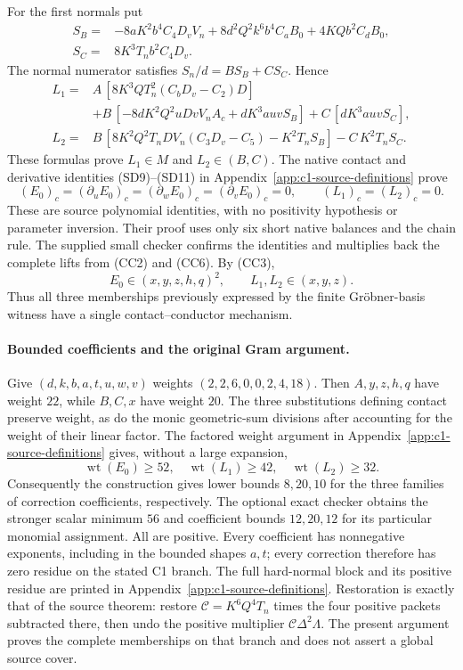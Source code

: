 For the first normals put
\begin{align*}
 S_B={}&-8aK^2b^4C_4D_vV_n
          +8d^2Q^2k^6b^4C_aB_0+4KQb^2C_dB_0,\\
 S_C={}&8K^3T_nb^2C_4D_v.
\end{align*}
The normal numerator satisfies $S_n/d=BS_B+CS_C$. Hence
\begin{align*}
 L_1={}& A\,[8K^3QT_n^2(C_bD_v-C_2)D]\\
 &+B\,[-8dK^2Q^2uDvV_nA_c+dK^3auvS_B]
       +C\,[dK^3auvS_C],\\
 L_2={}&B\,[8K^2Q^2T_nDV_n(C_3D_v-C_5)-K^2T_nS_B]
       -C\,K^2T_nS_C.
\end{align*}
These formulas prove $L_1\in M$ and $L_2\in(B,C)$.
The native contact and derivative identities (SD9)--(SD11) in
Appendix~\ref{app:c1-source-definitions} prove
\[
 (E_0)_c=(\partial_uE_0)_c=(\partial_wE_0)_c
          =(\partial_vE_0)_c=0,\qquad (L_1)_c=(L_2)_c=0.      \tag{CC7}
\]
These are source polynomial identities, with no positivity hypothesis or
parameter inversion. Their proof uses only six short native balances and
the chain rule. The supplied small checker confirms the identities and
multiplies back the complete lifts from (CC2) and (CC6).
By (CC3),
\[
 E_0\in(x,y,z,h,q)^2,\qquad L_1,L_2\in(x,y,z).          \tag{CC8}
\]
Thus all three memberships previously expressed by the finite
Gr\"obner-basis witness have a single contact--conductor mechanism.

\paragraph{Bounded coefficients and the original Gram argument.}
Give $(d,k,b,a,t,u,w,v)$ weights $(2,2,6,0,0,2,4,18)$.
Then $A,y,z,h,q$ have weight $22$, while $B,C,x$ have weight $20$.
The three substitutions defining contact preserve weight, as do the
monic geometric-sum divisions after accounting for the weight of their
linear factor. The factored weight argument in
Appendix~\ref{app:c1-source-definitions} gives, without a large expansion,
\[
 \operatorname{wt}(E_0)\ge52,\quad
 \operatorname{wt}(L_1)\ge42,\quad
 \operatorname{wt}(L_2)\ge32.
\]
Consequently the construction gives lower bounds $8,20,10$ for the
three families of correction coefficients, respectively. The optional
exact checker obtains the stronger scalar minimum $56$ and coefficient
bounds $12,20,12$ for its particular monomial assignment.
All are positive. Every coefficient has nonnegative
exponents, including in the bounded shapes $a,t$; every correction
therefore has zero residue on the stated C1 branch. The full hard-normal
block and its positive residue are printed in
Appendix~\ref{app:c1-source-definitions}. Restoration is exactly that of the source theorem: restore
$\mathcal C=K^6Q^4T_n$ times the four positive packets subtracted there,
then undo the positive multiplier $\mathcal C\Delta^2\Lambda$. The present argument proves the complete
memberships on that branch and does not assert a global source cover.
